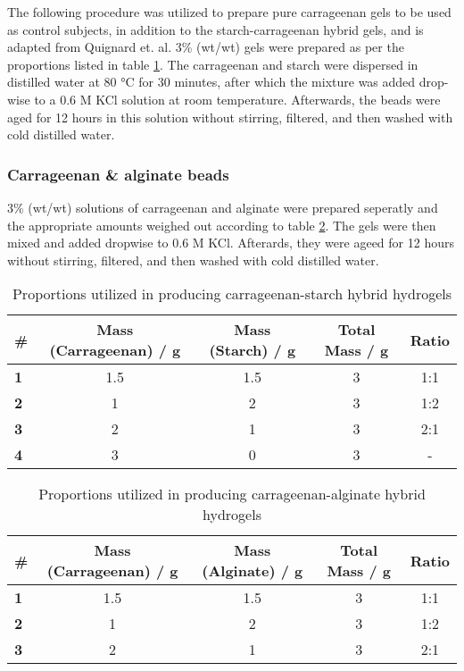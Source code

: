 \documentclass[a4paper,12pt]{article}
\begin{document}
The following procedure was utilized to prepare pure carrageenan gels to be used as control subjects, in addition to the starch-carrageenan hybrid gels, and is adapted from Quignard et. al\supercite{quignard_aerogel_2008}. 3\% (wt/wt) gels were prepared as per the proportions listed in table \ref{tab1}. The carrageenan and starch were dispersed in distilled water at 80 °C for 30 minutes, after which the mixture was added drop-wise to a 0.6 M KCl solution at room temperature. Afterwards, the beads were aged for 12 hours in this solution without stirring, filtered, and then washed with cold distilled water.

\subsubsection{Carrageenan \& alginate beads}

3\% (wt/wt) solutions of carrageenan and alginate were prepared seperatly and the appropriate amounts weighed out according to table \ref{tab2}. The gels were then mixed and added dropwise to 0.6 M KCl. Afterards, they were ageed for 12 hours without stirring, filtered, and then washed with cold distilled water.

\begin{table}[H]
\centering
\caption{Proportions utilized in producing carrageenan-starch hybrid hydrogels}
\label{tab1}
\begin{tabular}{@{}lcccc@{}}
\toprule
\textbf{\#} & \textbf{Mass (Carrageenan) / g} & \textbf{Mass (Starch) / g} & \textbf{Total Mass / g} & \textbf{Ratio} \\ \midrule
\textbf{1} & 1.5 & 1.5 & 3 & 1:1 \\
\textbf{2} & 1 & 2 & 3 & 1:2 \\
\textbf{3} & 2 & 1 & 3 & 2:1 \\
\textbf{4} & 3 & 0 & 3 & - \\ \bottomrule
\end{tabular}%
\end{table}

\begin{table}[H]
\centering
\caption{Proportions utilized in producing carrageenan-alginate hybrid hydrogels}
\label{tab2}
\begin{tabular}{@{}lcccc@{}}
\toprule
\textbf{\#} & \textbf{Mass (Carrageenan) / g} & \textbf{Mass (Alginate) / g} & \textbf{Total Mass / g} & \textbf{Ratio} \\ \midrule
\textbf{1} & 1.5 & 1.5 & 3 & 1:1 \\
\textbf{2} & 1 & 2 & 3 & 1:2 \\
\textbf{3} & 2 & 1 & 3 & 2:1 \\ \bottomrule
\end{tabular}%
\end{table}
\end{document}
